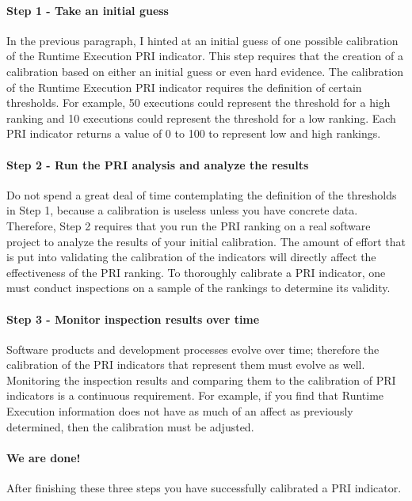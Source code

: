 \paragraph{Step 1 - Take an initial guess}
In the previous paragraph, I hinted at an initial guess of one possible
calibration of the Runtime Execution PRI indicator. This step requires that
the creation of a calibration based on either an initial guess or even hard
evidence. The calibration of the Runtime Execution PRI indicator requires
the definition of certain thresholds. For example, 50 executions could
represent the threshold for a high ranking and 10 executions could
represent the threshold for a low ranking. Each PRI indicator returns a
value of 0 to 100 to represent low and high rankings.


\paragraph{Step 2 - Run the PRI analysis and analyze the results}
Do not spend a great deal of time contemplating the definition of the
thresholds in Step 1, because a calibration is useless unless you have
concrete data. Therefore, Step 2 requires that you run the PRI ranking on a
real software project to analyze the results of your initial calibration.
The amount of effort that is put into validating the calibration of the
indicators will directly affect the effectiveness of the PRI ranking. To
thoroughly calibrate a PRI indicator, one must conduct inspections on a
sample of the rankings to determine its validity.

\paragraph{Step 3 - Monitor inspection results over time}
Software products and development processes evolve over time; therefore the
calibration of the PRI indicators that represent them must evolve as well.
Monitoring the inspection results and comparing them to the calibration of
PRI indicators is a continuous requirement. For example, if you find that
Runtime Execution information does not have as much of an affect as
previously determined, then the calibration must be adjusted.

\paragraph{We are done!} 
After finishing these three steps you have successfully calibrated a PRI
indicator.

